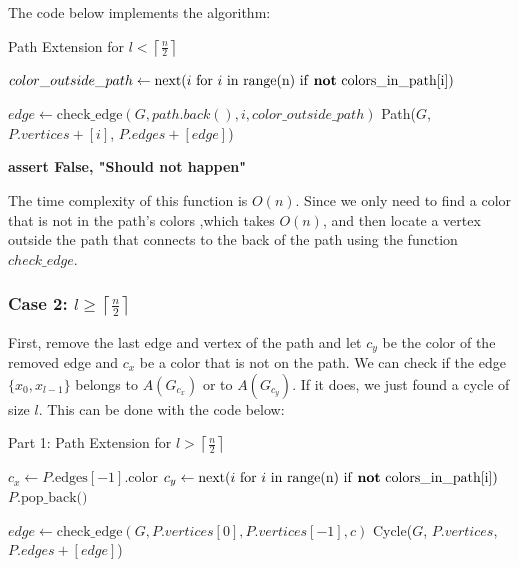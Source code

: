 The code below implements the algorithm:

\begin{algorithm}[H]
    \caption{Path Extension for \( l < \left \lceil \frac{n}{2} \right \rceil \)}
    \begin{algorithmic}[1]
        \State $color\_outside\_path \gets \text{next}(i \text{ for } i \text{ in range(n) if \textbf{not} colors\_in\_path[i]})$

                \State $edge \gets \text{check\_edge}(G, path.back(), i, color\_outside\_path)$
                    \State \Return Path($G$, $P.vertices + [i]$, $P.edges + [edge]$)
                \EndIf
            \EndIf
        \EndFor

        \State \textbf{assert False, "Should not happen"}
    \EndFunction
    \end{algorithmic}
\end{algorithm}

The time complexity of this function is \( O(n) \). Since we 
only need to find a color that is not in the path’s colors 
,which takes \( O(n) \), and then locate a vertex outside 
the path that connects to the back of the path using the 
function $check\_edge$.

\subsubsection{Case 2: \( l \geq \left \lceil \frac{n}{2} \right \rceil \)}

First, remove the last edge and
vertex of the path and let $c_y$ be the color of the removed edge and $c_x$ 
be a color that is not on the path.
We can check if the edge $\{x_0, x_{l-1}\}$ belongs to $A(G_{c_x})$ or
to $A(G_{c_y})$. If it does, we just found a cycle of size $l$. 
This can be done with the code below:

\begin{algorithm}[H]
    \caption{Part 1: Path Extension for \( l > \left \lceil \frac{n}{2} \right \rceil \)}
    \begin{algorithmic}
            \State $c_x \gets P.\text{edges}[-1].\text{color}$ 
            \State $c_y \gets \text{next}(i \text{ for } i \text{ in range(n) if \textbf{not} colors\_in\_path[i]})$
            \State $P.\text{pop\_back()}$ 

                \State $edge \gets \text{check\_edge}(G, P.vertices[0], P.vertices[-1], c)$
                    \State \Return Cycle($G$, $P.vertices$, $P.edges + [edge]$) 
                \EndIf
            \EndFor
        \EndFunction
    \end{algorithmic}
\end{algorithm}

